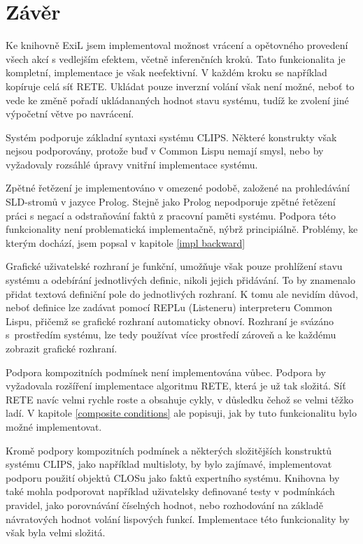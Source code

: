\section{Závěr}

Ke knihovně ExiL jsem implementoval možnost vrácení a opětovného provedení všech
akcí s vedlejším efektem, včetně inferenčních kroků. Tato funkcionalita je
kompletní, implementace je však neefektivní. V každém kroku se například
kopíruje celá síť RETE. Ukládat pouze inverzní volání však není možné, neboť to
vede ke změně pořadí ukládananých hodnot stavu systému, tudíž ke zvolení jiné
výpočetní větve po navrácení.

Systém podporuje základní syntaxi systému CLIPS. Některé konstrukty však nejsou
podporovány, protože buď v Common Lispu nemají smysl, nebo by vyžadovaly rozsáhlé
úpravy vnitřní implementace systému.

Zpětné řetězení je implementováno v omezené podobě, založené na prohledávání
SLD-stromů v jazyce Prolog. Stejně jako Prolog nepodporuje zpětné řetězení práci
s negací a odstraňování faktů z pracovní paměti systému. Podpora této
funkcionality není problematická implementačně, nýbrž principiálně. Problémy, ke
kterým dochází, jsem popsal v kapitole \ref{impl backward}

Grafické uživatelské rozhraní je funkční, umožňuje však pouze prohlížení stavu
systému a odebírání jednotlivých definic, nikoli jejich přidávání. To by
znamenalo přidat textová definiční pole do jednotlivých rozhraní. K tomu ale
nevidím důvod, neboť definice lze zadávat pomocí REPLu (Listeneru) interpreteru
Common Lispu, přičemž se grafické rozhraní automaticky obnoví. Rozhraní je
svázáno s~prostředím systému, lze tedy používat více prostředí zároveň a ke
každému zobrazit grafické rozhraní.

Podpora kompozitních podmínek není implementována vůbec. Podpora by
vyžadovala rozšíření implementace algoritmu RETE, která je už tak složitá. Síť
RETE navíc velmi rychle roste a obsahuje cykly, v důsledku čehož se velmi těžko
ladí. V kapitole \ref{composite conditions} ale popisuji, jak by tuto
funkcionalitu bylo možné implementovat.

Kromě podpory kompozitních podmínek a některých složitějších konstruktů systému
CLIPS, jako například multisloty, by bylo zajímavé, implementovat podporu
použití objektů CLOSu jako faktů expertního systému. Knihovna by také mohla
podporovat například uživatelsky definované testy v podmínkách pravidel, jako
porovnávání číselných hodnot, nebo rozhodování na základě návratových hodnot
volání lispových funkcí. Implementace této funkcionality by však byla velmi
složitá.

